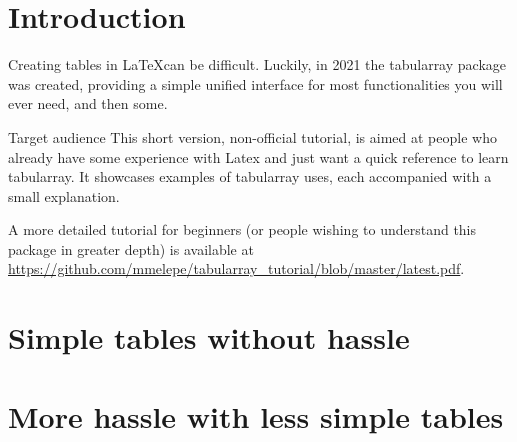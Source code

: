 \documentclass[oneside]{book}
\begin{document}
	
	
	
	\chapter*{Introduction}
	Creating tables in \LaTeX can be difficult. Luckily, in 2021 the tabularray package was created, providing a simple unified interface for most functionalities you will ever need, and then some.
	
	\begin{infobox}{Target audience}
		This short version, non-official tutorial, is aimed at people who already have some experience with Latex and just want a quick reference to learn tabularray. It showcases examples of tabularray uses, each accompanied with a small explanation.
		
		A more detailed tutorial for beginners (or people wishing to understand this package in greater depth) is available at \url{https://github.com/mmelepe/tabularray_tutorial/blob/master/latest.pdf}.
	\end{infobox}
	
	\tableofcontents
	
	\chapter{Simple tables without hassle}
	
	
	
%	
	\chapter{More hassle with less simple tables}
	
	
	
	
%	
%	
%	
%	
%	
%	
%	
%	
	
	
\end{document}
